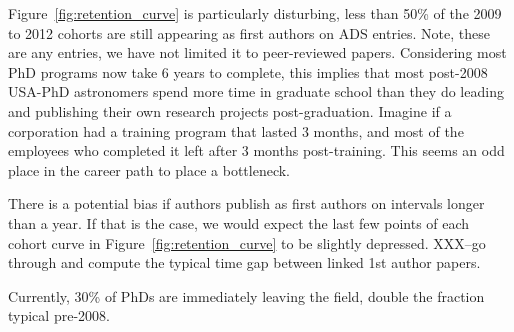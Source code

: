 \documentclass[preprint2]{aastex}
\begin{document}
Figure~\ref{fig:retention_curve} is particularly disturbing, less than 50\% of the 2009 to 2012 cohorts are still appearing as first authors on ADS entries. Note, these are any entries, we have not limited it to peer-reviewed papers.  Considering most PhD programs now take 6 years to complete, this implies that most post-2008 USA-PhD astronomers spend more time in graduate school than they do leading and publishing their own research projects post-graduation. Imagine if a corporation had a training program that lasted 3 months, and most of the employees who completed it left after 3 months post-training.  This seems an odd place in the career path to place a bottleneck.

There is a potential bias if authors publish as first authors on intervals longer than a year.  If that is the case, we would expect the last few points of each cohort curve in Figure~\ref{fig:retention_curve} to be slightly depressed.  XXX--go through and compute the typical time gap between linked 1st author papers.  

Currently, 30\% of PhDs are immediately leaving the field, double the fraction typical pre-2008.  





\end{document}
